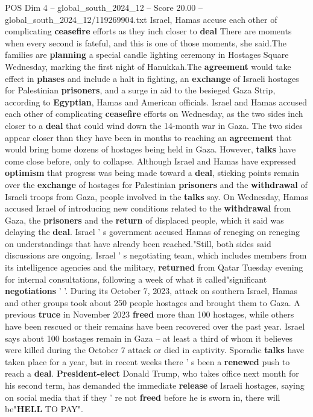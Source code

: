 \begin{textsample}{POS Dim 4 – global\_south\_2024\_12 – Score 20.00 – global\_south\_2024\_12/119269904.txt}  \label{ex:f4_pos_256}
Israel, Hamas accuse each other of complicating \textbf{ceasefire} efforts as they inch closer to \textbf{deal} There are moments when every second is fateful, and this is one of those moments, she said.The families are \textbf{planning} a special candle lighting ceremony in Hostages Square Wednesday, marking the first night of Hanukkah.The \textbf{agreement} would take effect in \textbf{phases} and include a halt in fighting, an \textbf{exchange} of Israeli hostages for Palestinian \textbf{prisoners}, and a surge in aid to the besieged Gaza Strip, according to \textbf{Egyptian}, Hamas and American officials.
Israel and Hamas accused each other of complicating \textbf{ceasefire} efforts on Wednesday, as the two sides inch closer to a \textbf{deal} that could wind down the 14-month war in Gaza.
The two sides appear closer than they have been in months to reaching an \textbf{agreement} that would bring home dozens of hostages being held in Gaza.
However, \textbf{talks} have come close before, only to collapse.
Although Israel and Hamas have expressed \textbf{optimism} that progress was being made toward a \textbf{deal}, sticking points remain over the \textbf{exchange} of hostages for Palestinian \textbf{prisoners} and the \textbf{withdrawal} of Israeli troops from Gaza, people involved in the \textbf{talks} say.
On Wednesday, Hamas accused Israel of introducing new conditions related to the \textbf{withdrawal} from Gaza, the \textbf{prisoners} and the \textbf{return} of displaced people, which it said was delaying the \textbf{deal}.
Israel ' s government accused Hamas of reneging on reneging on understandings that have already been reached."Still, both sides said discussions are ongoing.
Israel ' s negotiating team, which includes members from its intelligence agencies and the military, \textbf{returned} from Qatar Tuesday evening for internal consultations, following a week of what it called"significant \textbf{negotiations} ' '.
During its October 7, 2023, attack on southern Israel, Hamas and other groups took about 250 people hostages and brought them to Gaza.
A previous \textbf{truce} in November 2023 \textbf{freed} more than 100 hostages, while others have been rescued or their remains have been recovered over the past year.
Israel says about 100 hostages remain in Gaza -- at least a third of whom it believes were killed during the October 7 attack or died in captivity.
Sporadic \textbf{talks} have taken place for a year, but in recent weeks there ' s been a \textbf{renewed} push to reach a \textbf{deal}. \textbf{President-elect} Donald Trump, who takes office next month for his second term, has demanded the immediate \textbf{release} of Israeli hostages, saying on social media that if they ' re not \textbf{freed} before he is sworn in, there will be"\textbf{HELL} TO PAY".

\end{textsample}
